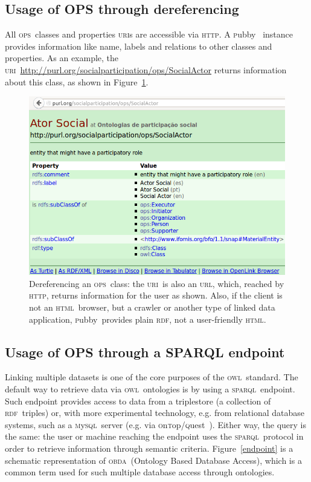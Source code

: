 \documentclass[10pt,letterpaper]{article}
\newcommand{\ops}{\textsc{ops}}
\newcommand{\owl}{\textsc{owl}}
\newcommand{\sparql}{\textsc{sparql}}
\newcommand{\html}{\textsc{html}}
\newcommand{\uri}{\textsc{uri}}
\newcommand{\urll}{\textsc{url}}
\newcommand{\http}{\textsc{http}}
\newcommand{\pubby}{\textsc{p}ubby}
\newcommand{\rdf}{\textsc{rdf}}
\newcommand{\mysql}{\textsc{m}y\textsc{sql}}
\newcommand{\ontop}{\textsc{o}n\textsc{t}op}
\newcommand{\quest}{\textsc{q}uest}
\newcommand{\obda}{\textsc{obda}}
\begin{document}
\subsection{Usage of OPS through dereferencing}
All \ops\ classes and properties \uri s are accessible via \http.
A \pubby~\cite{pubby} instance provides information like name,
labels and relations to other classes and properties.
As an example, the \uri\ \url{http://purl.org/socialparticipation/ops/SocialActor} returns information about this class, as shown in Figure~\ref{fig:deref}.
\begin{figure}[!h]
    \centering
    \includegraphics[width=\columnwidth]{figs/pubbyDer}
    \caption{Dereferencing an \ops\ class:
    the \uri\ is also an \urll, which, reached by \http,
    returns information for the user as shown.
    Also, if the client is not an \html\ browser, but a crawler or another type of linked data application,
    \pubby\ provides plain \rdf, not a user-friendly \html.}
    \label{fig:deref}
\end{figure}

\subsection{Usage of OPS through a SPARQL endpoint}
Linking multiple datasets is one of the core purposes of the \owl\ standard.
The default way to retrieve data via \owl\ ontologies is by using a \sparql\ endpoint.
Such endpoint provides access to data from a triplestore (a collection of \rdf\ triples) or,
with more experimental technology, e.g. from relational database systems, such as a \mysql\ server 
(e.g. via \ontop/\quest~\cite{onTop}).
Either way, the query is the same:
the user or machine reaching the endpoint uses the \sparql\
protocol in order to retrieve information through semantic criteria.
Figure~\ref{endpoint} is a schematic representation of \obda\ (Ontology Based Database Access),
which is a common term used for such multiple database access through ontologies.
\end{document}
